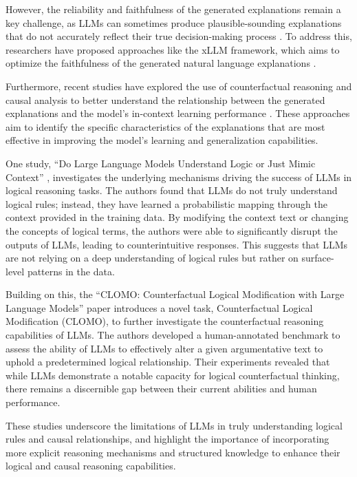 \documentclass[11pt]{article}
\begin{document}
However, the reliability and faithfulness of the generated explanations remain a key challenge, as LLMs can sometimes produce plausible-sounding explanations that do not accurately reflect their true decision-making process \cite{ref203}. To address this, researchers have proposed approaches like the xLLM framework, which aims to optimize the faithfulness of the generated natural language explanations \cite{ref209}.

Furthermore, recent studies have explored the use of counterfactual reasoning and causal analysis to better understand the relationship between the generated explanations and the model's in-context learning performance \cite{ref196}. These approaches aim to identify the specific characteristics of the explanations that are most effective in improving the model's learning and generalization capabilities.

One study, ``Do Large Language Models Understand Logic or Just Mimic Context'' \cite{ref211}, investigates the underlying mechanisms driving the success of LLMs in logical reasoning tasks. The authors found that LLMs do not truly understand logical rules; instead, they have learned a probabilistic mapping through the context provided in the training data. By modifying the context text or changing the concepts of logical terms, the authors were able to significantly disrupt the outputs of LLMs, leading to counterintuitive responses. This suggests that LLMs are not relying on a deep understanding of logical rules but rather on surface-level patterns in the data.

Building on this, the ``CLOMO: Counterfactual Logical Modification with Large Language Models'' \cite{ref212} paper introduces a novel task, Counterfactual Logical Modification (CLOMO), to further investigate the counterfactual reasoning capabilities of LLMs. The authors developed a human-annotated benchmark to assess the ability of LLMs to effectively alter a given argumentative text to uphold a predetermined logical relationship. Their experiments revealed that while LLMs demonstrate a notable capacity for logical counterfactual thinking, there remains a discernible gap between their current abilities and human performance.

These studies underscore the limitations of LLMs in truly understanding logical rules and causal relationships, and highlight the importance of incorporating more explicit reasoning mechanisms and structured knowledge to enhance their logical and causal reasoning capabilities.
\end{document}
